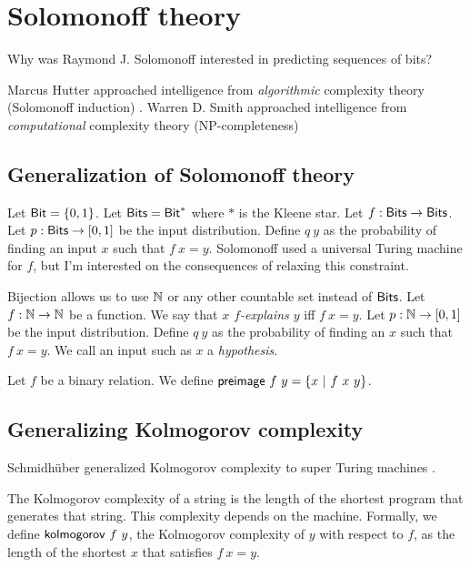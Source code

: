 \chapter{Solomonoff theory}

Why was Raymond J. Solomonoff \cite{SolAlpProb2011, GacsVitanyiSolomonoff}
interested in predicting sequences of bits?

Marcus Hutter approached intelligence from \emph{algorithmic} complexity theory (Solomonoff induction)
\cite{DefineMachIntel}.
Warren D. Smith approached intelligence from \emph{computational} complexity theory
(NP-completeness)
\cite{WdsIntel, WdsIntelSlide}

\section{Generalization of Solomonoff theory}

\newcommand\Bit{\fun{Bit}}
\newcommand\Bits{\fun{Bits}}

Let \(\Bit = \{0,1\}\).
Let \(\Bits = \Bit^*\) where \(*\) is the Kleene star.
Let \(f : \Bits \to \Bits\).
Let \(p : \Bits \to [0,1]\) be the input distribution.
Define \(q~y\) as the probability of finding an input \(x\) such that \(f~x = y\).
Solomonoff used a universal Turing machine for \(f\),
but I'm interested on the consequences of relaxing this constraint.

Bijection allows us to use \(\mathbb{N}\) or any other countable set instead of \(\Bits\).
Let \(f : \mathbb{N} \to \mathbb{N}\) be a function.
We say that \emph{\(x\) \(f\)-explains \(y\)} iff \(f~x = y\).
Let \(p : \mathbb{N} \to [0,1]\) be the input distribution.
Define \(q~y\) as the probability of finding an \(x\) such that \(f~x = y\).
We call an input such as \(x\) a \emph{hypothesis}.

\newcommand\preimage{\fun{preimage}}

Let \(f\) be a binary relation.
We define \(\preimage~f~y = \{ x ~|~ f~x~y \}\).

\section{Generalizing Kolmogorov complexity}

Schmidh\"uber generalized Kolmogorov complexity to super Turing machines \cite{SchmidhuberKolmogorov}.

The Kolmogorov complexity of a string
is the length of the shortest program that generates that string.
This complexity depends on the machine.
Formally, we define \(\textsf{kolmogorov}~f~y\),
the Kolmogorov complexity of \(y\) with respect to \(f\),
as the length of the shortest \(x\) that satisfies \(f~x = y\).

